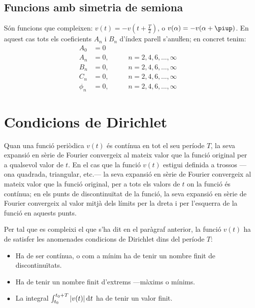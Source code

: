 \subsection{Funcions amb simetria de semiona}

Són funcions que compleixen: $v(t) = -v(t+\frac{T}{2})$, o $v(\alpha) = -v(\alpha+\piup)$. En aquest
cas tots els coeficients $A_n$ i $B_n$ d'índex parell s'anuŀlen;
en concret tenim:
\begin{subequations}
\begin{alignat}{2}
    A_0 &= 0       & \\[0.5ex]
    A_n &= 0,       &\qquad n = 2,4,6,\ldots,\infty\\[0.5ex]
    B_n &= 0,      &\qquad n = 2,4,6,\ldots,\infty\\[0.5ex]
    C_n &= 0,       &\qquad n = 2,4,6,\ldots,\infty\\[0.5ex]
    \phi_n &= 0, &\qquad n = 2,4,6,\ldots,\infty
\end{alignat}
\end{subequations}

\section{Condicions de Dirichlet}\label{sec:dirichlet}

Quan una funció periòdica $v(t)$  és contínua en tot el seu període
$T$, la seva expansió en sèrie de Fourier convergeix al mateix valor
que la funció original per a qualsevol valor de $t$.
En el cas que la funció $v(t)$ estigui definida a trossos ---ona quadrada, triangular, etc.--- la seva expansió en sèrie de Fourier convergeix al mateix valor que
la funció original, per a tots els valors de $t$ on la funció és
contínua;  en els punts de discontinuïtat de la funció, la seva
expansió en sèrie de Fourier convergeix al valor mitjà dels límits
per la dreta i per l'esquerra de la funció en aquests punts. 

Per tal que es compleixi el que s'ha dit en el paràgraf anterior, la funció $v(t)$ ha de satisfer les anomenades
condicions de Dirichlet dins del període $T$:
\begin{itemize}
   \item Ha de ser contínua, o com a mínim ha de tenir un nombre finit de discontinuïtats.
   \item Ha de tenir un nombre finit d'extrems ---màxims o mínims.
   \item La integral $\int_{t_0}^{t_0+T} |v(t)| \diff t$ ha de tenir un valor finit.
\end{itemize}

